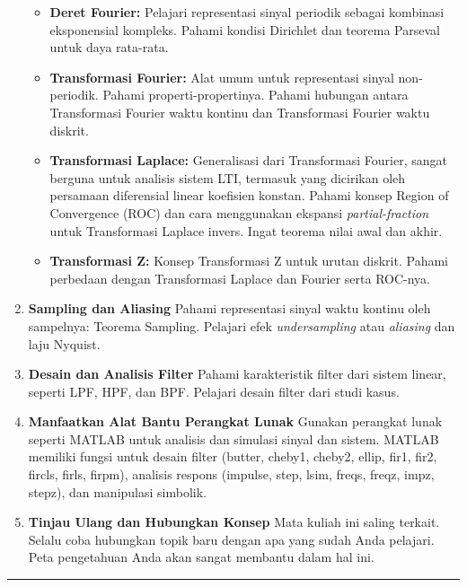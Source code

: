 \documentclass[
  letterpaper,
  DIV=11,
  numbers=noendperiod]{scrreprt}
\providecommand{\tightlist}{%
  \setlength{\itemsep}{0pt}\setlength{\parskip}{0pt}}
\begin{document}
\begin{enumerate}
  \begin{itemize}
  \tightlist
  \item
    \textbf{Deret Fourier:} Pelajari representasi sinyal periodik
    sebagai kombinasi eksponensial kompleks. Pahami kondisi Dirichlet
    dan teorema Parseval untuk daya rata-rata.
  \item
    \textbf{Transformasi Fourier:} Alat umum untuk representasi sinyal
    non-periodik. Pahami properti-propertinya. Pahami hubungan antara
    Transformasi Fourier waktu kontinu dan Transformasi Fourier waktu
    diskrit.
  \item
    \textbf{Transformasi Laplace:} Generalisasi dari Transformasi
    Fourier, sangat berguna untuk analisis sistem LTI, termasuk yang
    dicirikan oleh persamaan diferensial linear koefisien konstan.
    Pahami konsep Region of Convergence (ROC) dan cara menggunakan
    ekspansi \emph{partial-fraction} untuk Transformasi Laplace invers.
    Ingat teorema nilai awal dan akhir.
  \item
    \textbf{Transformasi Z:} Konsep Transformasi Z untuk urutan diskrit.
    Pahami perbedaan dengan Transformasi Laplace dan Fourier serta
    ROC-nya.
  \end{itemize}
\item
  \textbf{Sampling dan Aliasing} Pahami representasi sinyal waktu
  kontinu oleh sampelnya: Teorema Sampling. Pelajari efek
  \emph{undersampling} atau \emph{aliasing} dan laju Nyquist.
\item
  \textbf{Desain dan Analisis Filter} Pahami karakteristik filter dari
  sistem linear, seperti LPF, HPF, dan BPF. Pelajari desain filter dari
  studi kasus.
\item
  \textbf{Manfaatkan Alat Bantu Perangkat Lunak} Gunakan perangkat lunak
  seperti MATLAB untuk analisis dan simulasi sinyal dan sistem. MATLAB
  memiliki fungsi untuk desain filter (butter, cheby1, cheby2, ellip,
  fir1, fir2, fircls, firls, firpm), analisis respons (impulse, step,
  lsim, freqs, freqz, impz, stepz), dan manipulasi simbolik.
\item
  \textbf{Tinjau Ulang dan Hubungkan Konsep} Mata kuliah ini saling
  terkait. Selalu coba hubungkan topik baru dengan apa yang sudah Anda
  pelajari. Peta pengetahuan Anda akan sangat membantu dalam hal ini.
\end{enumerate}

\begin{center}\rule{0.5\linewidth}{0.5pt}\end{center}
\end{document}
